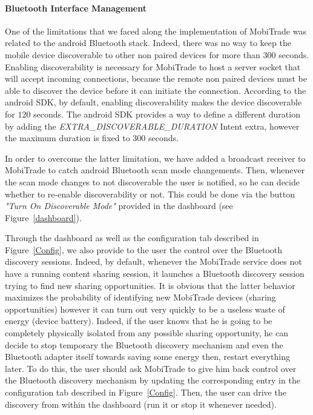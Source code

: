 \paragraph{Bluetooth Interface Management}

One of the limitations that we faced along the implementation of MobiTrade was related to the android Bluetooth stack. Indeed, there
was no way to keep the mobile device discoverable to other non paired devices for more than 300 seconds. Enabling discoverability is necessary for MobiTrade to host a server socket that will accept incoming connections, because the remote non paired devices must be able to discover the device before it can initiate the connection. According to the android SDK, by default, enabling discoverability makes the device discoverable for $120$ seconds. The android SDK provides a way to define a different duration by adding the \emph{EXTRA\_DISCOVERABLE\_DURATION} Intent extra, however the maximum duration is fixed to 300 seconds.

In order to overcome the latter limitation, we have added a broadcast receiver to MobiTrade to catch android Bluetooth scan mode changements. Then, whenever the scan mode changes to not discoverable the user is notified, so he can decide whether to re-enable discoverability or not. This could be done via the button \emph{"Turn On Discoverable Mode"} provided in the dashboard (see Figure~\ref{dashboard}).

Through the dashboard as well as the configuration tab described in Figure~\ref{Config}, we also provide to the user the control over the Bluetooth discovery sessions. Indeed, by default, whenever the MobiTrade service does not have a running content sharing session, it launches a Bluetooth discovery session trying to find new sharing opportunities. It is obvious that the latter behavior maximizes the probability of identifying new MobiTrade devices (sharing opportunities) however it can turn out very quickly to be a useless waste of energy (device battery). Indeed, if the user knows that he is going to be completely physically isolated from any possible sharing opportunity, he can decide to stop temporary the Bluetooth discovery mechanism and even the Bluetooth adapter itself towards saving some energy then, restart everything later. To do this, the user should ask MobiTrade to give him back control over the Bluetooth discovery mechanism by updating the corresponding entry in the configuration tab described in Figure~\ref{Config}. Then, the user can drive the discovery from within the dashboard (run it or stop it whenever needed).

